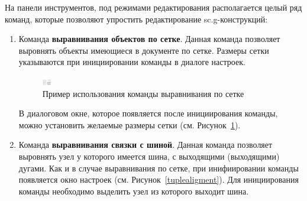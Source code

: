 На панели инструментов, под режимами редактирования располагается целый ряд команд, которые позволяют упростить редактирование sc.g-конструкций:
\begin{enumerate}
	\item Команда \textbf{выравнивания объектов по сетке}. Данная команда позволяет выровнять объекты имеющиеся в документе по сетке. Размеры сетки указываются при инициировании команды в диалоге настроек.
\begin{figure}[h]
	\centering\includegraphics[height=10.98, height=5.75cm]{../images/gridaligment.png}
	\caption{Пример использования команды выравнивания по сетке}
	\label{gridaligment}
\end{figure}
В диалоговом окне, которое появляется после инициирования команды, можно установить желаемые размеры сетки (см. Рисунок~\ref{gridaligment}).
	\item Команда \textbf{выравнивания связки с шиной}. Данная команда позволяет выровнять узел у которого имеется шина, с выходящими (выходящими) дугами. Как и в случае выравнивания по сетке, при инифиировании команды появляется окно настроек (см. Рисунок~\ref{tuplealigment}). Для инициирования команды необходимо выделить узел из которого выходит шина.
	

\end{enumerate}

